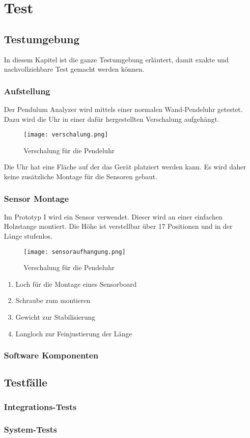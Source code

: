 \section{Test}
		\subsection{Testumgebung}
        In diesem Kapitel ist die ganze Testumgebung erläutert, damit exakte und nachvollziehbare Test gemacht werden können.
        \subsubsection{Aufstellung}
        Der Pendulum Analyzer wird mittels einer normalen Wand-Pendeluhr getestet. Dazu wird die Uhr in einer dafür hergestellten Verschalung aufgehängt.
        \begin{figure}[H]
            \centering
            \texttt{[image: verschalung.png]}
            \caption{Verschalung für die Pendeluhr}
        \end{figure}

        \noindent Die Uhr hat eine Fläche auf der das Gerät platziert werden kann. Es wird daher keine zusätzliche Montage für die Sensoren gebaut.
        
        \clearpage
        \subsubsection{Sensor Montage}
        Im Prototyp I wird ein Sensor verwendet. Dieser wird an einer einfachen Holzstange montiert. Die Höhe ist verstellbar über 17 Positionen und in der Länge stufenlos.
        \begin{figure}[H]
            \centering
            \texttt{[image: sensoraufhangung.png]}
            \caption{Verschalung für die Pendeluhr}
        \end{figure}
        \begin{enumerate}
            \item Loch für die Montage eines Sensorboard
            \item Schraube zum montieren
            \item Gewicht zur Stabilisierung
            \item Langloch zur Feinjustierung der Länge
        \end{enumerate}
        \subsubsection{Software Komponenten}

		\subsection{Testfälle}
			\subsubsection{Integrations-Tests}
				
			\subsubsection{System-Tests}